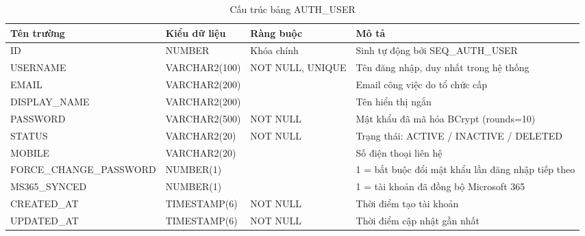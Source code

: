 \documentclass[../DoAn.tex]{subfiles}
\begin{document}
\begin{table}[H]
\centering
\caption{Cấu trúc bảng AUTH\_USER}
\label{tab:auth-user}
\footnotesize
\begin{tabular}{|p{3.0cm}|p{2.3cm}|p{2.7cm}|p{4.5cm}|}
\hline
\textbf{Tên trường} & \textbf{Kiểu dữ liệu} & \textbf{Ràng buộc} & \textbf{Mô tả} \\ \hline
ID & NUMBER & Khóa chính & Sinh tự động bởi SEQ\_AUTH\_USER \\ \hline
USERNAME & VARCHAR2(100) & NOT NULL, UNIQUE & Tên đăng nhập, duy nhất trong hệ thống \\ \hline
EMAIL & VARCHAR2(200) & & Email công việc do tổ chức cấp \\ \hline
DISPLAY\_NAME & VARCHAR2(200) & & Tên hiển thị ngắn \\ \hline
PASSWORD & VARCHAR2(500) & NOT NULL & Mật khẩu đã mã hóa BCrypt (rounds=10) \\ \hline
STATUS & VARCHAR2(20) & NOT NULL & Trạng thái: ACTIVE / INACTIVE / DELETED \\ \hline
MOBILE & VARCHAR2(20) & & Số điện thoại liên hệ \\ \hline
FORCE\_CHANGE\_PASSWORD & NUMBER(1) & & 1 = bắt buộc đổi mật khẩu lần đăng nhập tiếp theo \\ \hline
MS365\_SYNCED & NUMBER(1) & & 1 = tài khoản đã đồng bộ Microsoft 365 \\ \hline
CREATED\_AT & TIMESTAMP(6) & NOT NULL & Thời điểm tạo tài khoản \\ \hline
UPDATED\_AT & TIMESTAMP(6) & NOT NULL & Thời điểm cập nhật gần nhất \\ \hline
\end{tabular}
\end{table}
\end{document}
